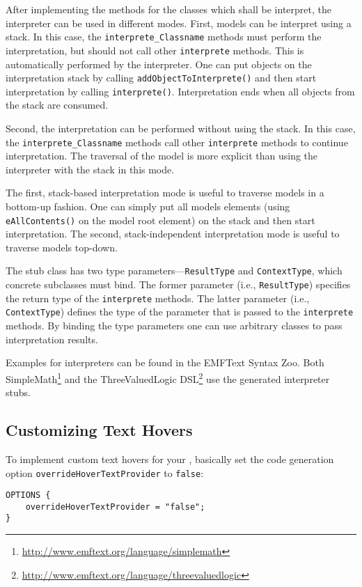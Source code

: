 After implementing the methods for the classes which shall be interpret, the
interpreter can be used in different modes. First, models can be interpret using
a stack. In this case, the \texttt{interprete\_Classname} methods must
perform the interpretation, but should not call other
\texttt{interprete} methods. This is automatically performed by the
interpreter. One can put objects on the interpretation stack by calling
\texttt{addObjectToInterprete()} and then start
interpretation by calling \texttt{interprete()}. Interpretation ends
when all objects from the stack are consumed.

Second, the interpretation can be performed without using the stack. In this
case, the \texttt{interprete\_Classname} methods call other
\texttt{interprete} methods to continue interpretation. The traversal of the
model is more explicit than using the interpreter with the stack in this mode.

The first, stack-based interpretation mode is useful to traverse models in a
bottom-up fashion. One can simply put all models elements (using
\texttt{eAllContents()} on the model root element) on the stack and then start
interpretation. The second, stack-independent interpretation mode is useful to
traverse models top-down.

The stub class has two type parameters---\texttt{ResultType} and
\texttt{ContextType}, which concrete subclasses must bind. The former
parameter (i.e., \texttt{ResultType}) specifies the return type of the
\texttt{interprete} methods. The latter parameter (i.e., \texttt{ContextType})
defines the type of the parameter that is passed to the \texttt{interprete}
methods. By binding the type parameters one can use arbitrary classes to pass
interpretation results.

Examples for interpreters can be found in the EMFText Syntax
Zoo. Both SimpleMath\footnote{\url{http://www.emftext.org/language/simplemath}}
and the ThreeValuedLogic
DSL\footnote{\url{http://www.emftext.org/language/threevaluedlogic}} use the
generated interpreter stubs.

\subsection{Customizing Text Hovers}

To implement custom text hovers for your \DSL, basically set the code
generation option \texttt{overrideHoverTextProvider} to \texttt{false}:

\begin{lstlisting}
OPTIONS {
    overrideHoverTextProvider = "false";
}
\end{lstlisting}


